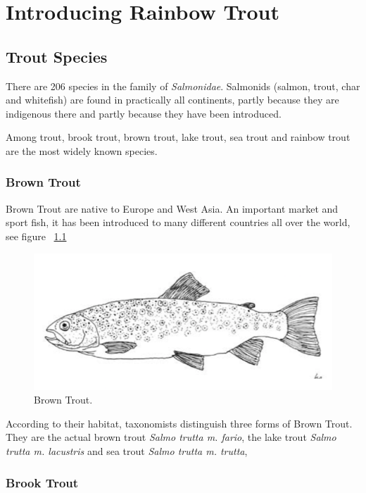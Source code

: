 \chapter{Introducing Rainbow Trout}

\section{Trout Species}

There are 206 species in the family of {\it Salmonidae}. 
Salmonids (salmon, trout, char and whitefish) are found in practically all continents, 
partly because they are indigenous there and partly because they have been introduced.

Among trout, brook trout, brown trout, lake trout, sea trout and rainbow trout are the most 
widely known species.

\subsection{Brown Trout} 

Brown Trout are native to Europe and West Asia. An important market and sport fish, 
it has been introduced to many different countries all over the world, see figure  ~\ref{fig:BrownTrout}


\begin{figure}[H]
  \centering
   \includegraphics[scale = 0.5]{images/BrownTrout.png}
  \caption{Brown Trout.}
   \label{fig:BrownTrout}
\end{figure}

According to their habitat, taxonomists distinguish three forms of Brown Trout. 
They are the actual brown trout {\it Salmo trutta m. fario},  the
lake trout {\it Salmo trutta m. lacustris} and sea trout {\it Salmo trutta m. trutta},



\subsection{Brook Trout}


